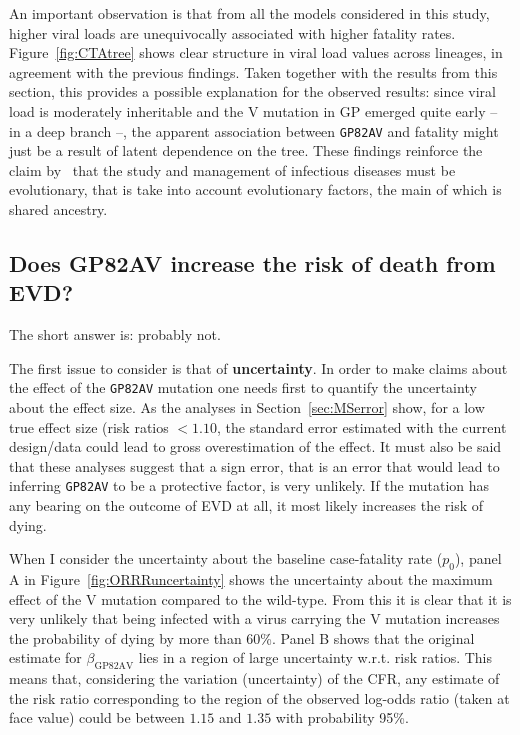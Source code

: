 An important observation is that from all the models considered in this study, higher viral loads are unequivocally associated with higher fatality rates.
Figure~\ref{fig:CTAtree} shows clear structure in viral load values across lineages, in agreement with the previous findings.
Taken together with the results from this section, this provides a possible explanation for the observed results: since viral load is moderately inheritable and the V mutation in GP emerged quite early -- in a deep branch --, the apparent association between \verb|GP82AV| and fatality might just be a result of latent dependence on the tree.
These findings reinforce the claim by~\cite{Russell2017} that the study and management of infectious diseases must be evolutionary, that is take into account evolutionary factors, the main of which is shared ancestry.

\subsection{Does GP82AV increase the risk of death from EVD?}

The short answer is: probably not.

The first issue to consider is that of \textbf{uncertainty}. 
In order to make claims about the effect of the \verb|GP82AV| mutation one needs first to quantify the uncertainty about the effect size.
As the analyses in Section~\ref{sec:MSerror} show, for a low true effect size (risk ratios $<1.10$, the standard error estimated with the current design/data could lead to gross overestimation of the effect. 
It must also be said that these analyses suggest that a sign error, that is an error that would lead to inferring \verb|GP82AV| to be a protective factor, is very unlikely.
If the mutation has any bearing on the outcome of EVD at all, it most likely increases the risk of dying.

When I consider the uncertainty about the baseline case-fatality rate ($p_0$), panel A in Figure~\ref{fig:ORRRuncertainty} shows the uncertainty about the maximum effect of the V mutation compared to the wild-type.
From this it is clear that it is very unlikely that being infected with a virus carrying the V mutation increases the probability of dying by more than $60$\%.
Panel B shows that the original estimate for $\beta_{\text{GP82AV}}$ lies in a region of large uncertainty w.r.t. risk ratios.
This means that, considering the variation (uncertainty) of the CFR, any estimate of the risk ratio corresponding  to the region of the observed log-odds ratio (taken at face value) could be between $1.15$ and $1.35$ with probability 95\%.

